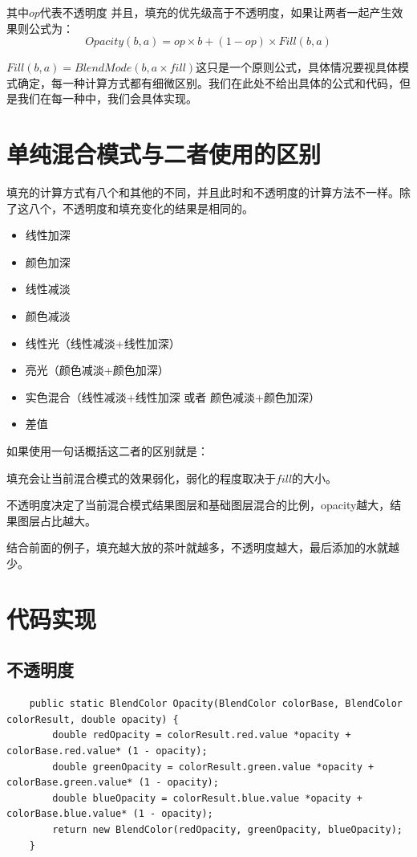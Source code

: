 其中$op$代表不透明度
并且，填充的优先级高于不透明度，如果让两者一起产生效果则公式为：
\begin{equation}
	Opacity(b,a)= op\times b + (1-op)\times Fill(b,a)
\end{equation}
\begin{notice}
\item $Fill(b,a)= BlendMode(b,a\times fill)$这只是一个原则公式，具体情况要视具体模式确定，每一种计算方式都有细微区别。我们在此处不给出具体的公式和代码，但是我们在每一种中，我们会具体实现。
\end{notice}

\section{单纯混合模式与二者使用的区别}
填充的计算方式有八个和其他的不同，并且此时和不透明度的计算方法不一样。除了这八个，不透明度和填充变化的结果是相同的。


\begin{itemize}
	\item  线性加深
	\item  颜色加深
	\item  线性减淡
	\item  颜色减淡
	\item  线性光（线性减淡+线性加深）
	\item  亮光（颜色减淡+颜色加深）
	\item  实色混合（线性减淡+线性加深 或者 颜色减淡+颜色加深）
	\item  差值
\end{itemize}

如果使用一句话概括这二者的区别就是：
\begin{notice}
	\item 填充会让当前混合模式的效果弱化，弱化的程度取决于$fill$的大小。
	\item 不透明度决定了当前混合模式结果图层和基础图层混合的比例，opacity越大，结果图层占比越大。
	\item 结合前面的例子，填充越大放的茶叶就越多，不透明度越大，最后添加的水就越少。
\end{notice}
\section{ 代码实现}
\subsection{不透明度}
\begin{lstlisting}
	public static BlendColor Opacity(BlendColor colorBase, BlendColor colorResult, double opacity) {
		double redOpacity = colorResult.red.value *opacity + colorBase.red.value* (1 - opacity);
		double greenOpacity = colorResult.green.value *opacity + colorBase.green.value* (1 - opacity);
		double blueOpacity = colorResult.blue.value *opacity + colorBase.blue.value* (1 - opacity);
		return new BlendColor(redOpacity, greenOpacity, blueOpacity);
	}
\end{lstlisting}

